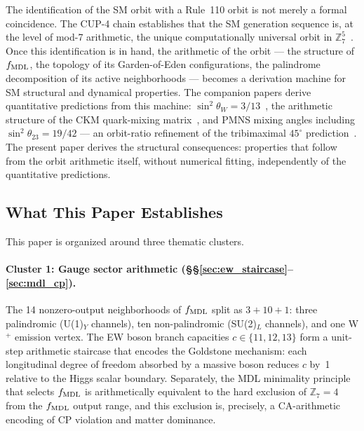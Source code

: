 \documentclass[11pt]{article}
\theoremstyle{remark}
\newcommand{\sinwsq}{\sin^2\!\theta_W}
\begin{document}
The identification of the SM orbit with a Rule~110 orbit is not merely a
formal coincidence.  The CUP-4 chain establishes that the SM generation
sequence is, at the level of mod-7 arithmetic, the unique computationally
universal orbit in $\mathbb{Z}_7^5$~\cite{SpivackCompUniversality}.
Once this identification is in hand, the arithmetic of the orbit --- the
structure of $f_{\rm MDL}$, the topology of its Garden-of-Eden configurations,
the palindrome decomposition of its active neighborhoods --- becomes a
derivation machine for SM structural and dynamical properties.
The companion papers derive quantitative predictions from this machine:
$\sinwsq = 3/13$~\cite{SpivackWeinberg}, the arithmetic structure of the
CKM quark-mixing matrix~\cite{SpivackCKM}, and PMNS mixing angles including
$\sin^2\!\theta_{23} = 19/42$ --- an orbit-ratio refinement of the
tribimaximal $45^\circ$ prediction~\cite{SpivackNeutrino}.
The present paper derives the structural consequences: properties that follow
from the orbit arithmetic itself, without numerical fitting, independently of
the quantitative predictions.

\subsection{What This Paper Establishes}

This paper is organized around three thematic clusters.

\paragraph{Cluster 1: Gauge sector arithmetic (\S\S\ref{sec:ew_staircase}--\ref{sec:mdl_cp}).}
The 14 nonzero-output neighborhoods of $f_{\rm MDL}$ split as $3 + 10 + 1$:
three palindromic (U(1)$_Y$ channels), ten non-palindromic (SU(2)$_L$
channels), and one W$^+$ emission vertex.
The EW boson branch capacities $c \in \{11, 12, 13\}$ form a unit-step
arithmetic staircase that encodes the Goldstone mechanism: each longitudinal
degree of freedom absorbed by a massive boson reduces $c$ by~1 relative to the
Higgs scalar boundary.
Separately, the MDL minimality principle that selects $f_{\rm MDL}$ is
arithmetically equivalent to the hard exclusion of $\mathbb{Z}_7 = 4$ from
the $f_{\rm MDL}$ output range, and this exclusion is, precisely, a
CA-arithmetic encoding of CP violation and matter dominance.
\end{document}
